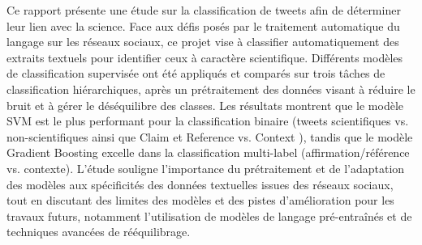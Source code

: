 Ce rapport présente une étude sur la classification de tweets afin de déterminer leur lien avec la science.
Face aux défis posés par le traitement automatique du langage sur les réseaux sociaux, ce projet vise à classifier automatiquement des extraits textuels pour identifier ceux à caractère scientifique.
Différents modèles de classification supervisée ont été appliqués et comparés sur trois tâches de classification hiérarchiques, après un prétraitement des données visant à réduire le bruit et à gérer le déséquilibre des classes.
Les résultats montrent que le modèle SVM est le plus performant pour la classification binaire (tweets scientifiques vs. non-scientifiques ainsi que Claim et Reference vs. Context ), tandis que le modèle Gradient Boosting excelle dans la classification multi-label (affirmation/référence vs. contexte).
L'étude souligne l'importance du prétraitement et de l'adaptation des modèles aux spécificités des données textuelles issues des réseaux sociaux, tout en discutant des limites des modèles et des pistes d'amélioration pour les travaux futurs, notamment l'utilisation de modèles de langage pré-entraînés et de techniques avancées de rééquilibrage.